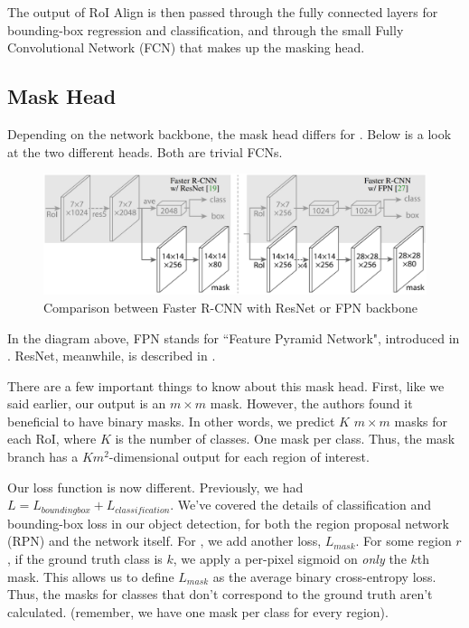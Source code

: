 The output of RoI Align is then passed through the fully connected layers for bounding-box regression and classification, and through the small Fully Convolutional Network (FCN) that makes up the masking head.

\subsection{Mask Head}\label{s:maskrcnn-maskhead}
Depending on the network backbone, the mask head differs for \maskrcnn. Below is a look at the two different heads. Both are trivial FCNs.

\begin{figure}[H]
	\centering
	\includegraphics[scale=0.3]{images/backbones.PNG}
	\caption{Comparison between Faster R-CNN with ResNet or FPN backbone}
\end{figure}

In the diagram above, FPN stands for ``Feature Pyramid Network", introduced in . ResNet, meanwhile, is described in .

There are a few important things to know about this mask head. First, like we said earlier, our output is an $m\times m$ mask. However, the authors found it beneficial to have binary masks. In other words, we predict $K$ $m\times m$ masks for each RoI, where $K$ is the number of classes. One mask per class. Thus, the mask branch has a $Km^2$-dimensional output for each region of interest.

Our loss function is now different. Previously, we had $L = L_{boundingbox} + L_{classification}$. We've covered the details of classification and bounding-box loss in our object detection, for both the region proposal network (RPN) and the network itself. For \maskrcnn, we add another loss, $L_{mask}$. For some region $r$, if the ground truth class is $k$, we apply a per-pixel sigmoid on \textit{only} the $k$th mask. This allows us to define $L_{mask}$ as the average binary cross-entropy loss. Thus, the masks for classes that don't correspond to the ground truth aren't calculated. (remember, we have one mask per class for every region).

